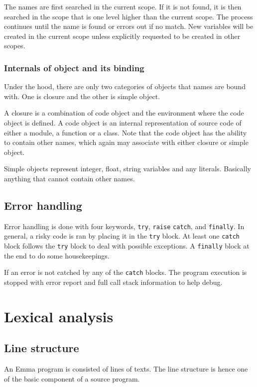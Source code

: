 \documentclass[10pt,a4paper]{article}
\begin{document}
The names are first searched in the current scope.
If it is not found, it is then searched in the scope that is one
level higher than the current scope. 
The process continues until the name is found or errors out if no match.
New variables will be created in the current scope unless explicitly 
requested to be created in other scopes.

\subsubsection{Internals of object and its binding}
Under the hood, there are only two categories of objects that names
are bound with. 
One is closure and the other is simple object.

A closure is a combination of code object and the environment where
the code object is defined.
A code object is an internal representation of source code of either a 
module, a function or a class.
Note that the code object has the ability to contain other names, which
again may associate with either closure or simple object.

Simple objects represent integer, float, string variables and any literals.
Basically anything that cannot contain other names.

\subsection{Error handling}
Error handling is done with four keywords, \lstinline$try$, \lstinline$raise$
\lstinline$catch$, and \lstinline$finally$.
In general, a risky code is ran by placing it in the \lstinline$try$ block.
At least one \lstinline$catch$ block follows the \lstinline$try$ block 
to deal with possible exceptions. A \lstinline$finally$ block at the end
to do some housekeepings.

If an error is not catched by any of the \lstinline$catch$ blocks.
The program execution is stopped with error report and full call
stack information to help debug.


\pagebreak

\section{Lexical analysis}
\subsection{Line structure}
An Emma program is consisted of lines of texts. The line structure is
hence one of the basic component of a source program.
\end{document}
